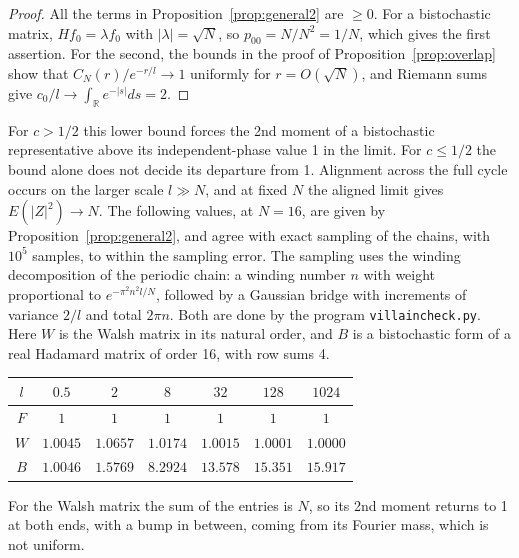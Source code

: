 \documentclass[11pt,a4paper]{article}
\theoremstyle{remark}
\begin{document}
\begin{proof}
All the terms in Proposition~\ref{prop:general2} are $\geq0$. For a bistochastic matrix, $Hf_0=\lambda f_0$ with $|\lambda|=\sqrt N$, so $p_{00}=N/N^2=1/N$, which gives the first assertion. For the second, the bounds in the proof of Proposition~\ref{prop:overlap} show that $C_N(r)/e^{-r/l}\to1$ uniformly for $r=O(\sqrt N)$, and Riemann sums give $c_0/l\to\int_{\mathbb R}e^{-|s|}ds=2$.
\end{proof}

For $c>1/2$ this lower bound forces the 2nd moment of a bistochastic representative above its independent-phase value 1 in the limit. For $c\le1/2$ the bound alone does not decide its departure from 1. Alignment across the full cycle occurs on the larger scale $l\gg N$, and at fixed $N$ the aligned limit gives $E(|Z|^2)\to N$. The following values, at $N=16$, are given by Proposition~\ref{prop:general2}, and agree with exact sampling of the chains, with $10^5$ samples, to within the sampling error. The sampling uses the winding decomposition of the periodic chain: a winding number $n$ with weight proportional to $e^{-\pi^2n^2l/N}$, followed by a Gaussian bridge with increments of variance $2/l$ and total $2\pi n$. Both are done by the program \texttt{villaincheck.py}. Here $W$ is the Walsh matrix in its natural order, and $B$ is a bistochastic form of a real Hadamard matrix of order 16, with row sums 4.

\medskip

\begin{center}
\begin{tabular}{|c|c|c|c|c|c|c|}
\hline
$l$ & $0.5$ & $2$ & $8$ & $32$ & $128$ & $1024$\\
\hline
$F$ & $1$ & $1$ & $1$ & $1$ & $1$ & $1$\\
$W$ & $1.0045$ & $1.0657$ & $1.0174$ & $1.0015$ & $1.0001$ & $1.0000$\\
$B$ & $1.0046$ & $1.5769$ & $8.2924$ & $13.578$ & $15.351$ & $15.917$\\
\hline
\end{tabular}
\end{center}

\medskip

For the Walsh matrix the sum of the entries is $N$, so its 2nd moment returns to 1 at both ends, with a bump in between, coming from its Fourier mass, which is not uniform.

\medskip
\end{document}
